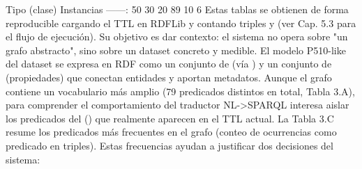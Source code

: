 {}\markdownRendererInterblockSeparator
{}\markdownRendererPipe{} Tipo (clase) \markdownRendererPipe{} \markdownRendererBackslash{}\markdownRendererHash{}Instancias \markdownRendererPipe{} \markdownRendererPipe{}---\markdownRendererPipe{}---:\markdownRendererPipe{} \markdownRendererPipe{}  \markdownRendererPipe{} 50 \markdownRendererPipe{} \markdownRendererPipe{}  \markdownRendererPipe{} 30 \markdownRendererPipe{} \markdownRendererPipe{}  \markdownRendererPipe{} 20 \markdownRendererPipe{} \markdownRendererPipe{}  \markdownRendererPipe{} 89 \markdownRendererPipe{} \markdownRendererPipe{}  \markdownRendererPipe{} 10 \markdownRendererPipe{} \markdownRendererPipe{}  \markdownRendererPipe{} 6 \markdownRendererPipe{}\markdownRendererInterblockSeparator
{}Estas tablas se obtienen de forma reproducible cargando el TTL en RDFLib y contando triples y  (ver Cap. 5.3 para el flujo de ejecución). Su objetivo es dar contexto: el sistema no opera sobre "un grafo abstracto", sino sobre un dataset concreto y medible.\markdownRendererInterblockSeparator
{}\markdownRendererInterblockSeparator
{}El modelo P510-like del dataset se expresa en RDF como un conjunto de  (vía ) y un conjunto de  (propiedades) que conectan entidades y aportan metadatos. Aunque el grafo contiene un vocabulario más amplio (79 predicados distintos en total, Tabla 3.A), para comprender el comportamiento del traductor NL->SPARQL interesa aislar los predicados del  () que realmente aparecen en el TTL actual.\markdownRendererInterblockSeparator
{}La Tabla 3.C resume los predicados  más frecuentes en el grafo (conteo de ocurrencias como predicado en triples). Estas frecuencias ayudan a justificar dos decisiones del sistema:\markdownRendererInterblockSeparator
